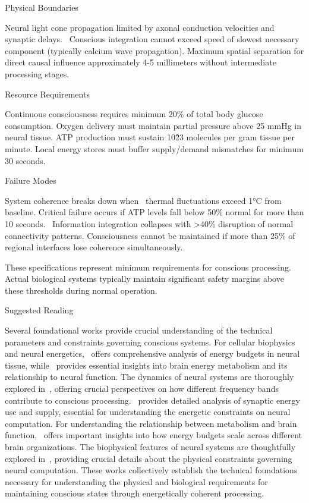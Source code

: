  Physical Boundaries

 Neural light cone propagation limited by axonal conduction velocities and synaptic delays.~ Conscious integration cannot exceed speed of slowest necessary component (typically calcium wave propagation). Maximum spatial separation for direct causal influence approximately 4-5 millimeters without intermediate processing stages.

 Resource Requirements

Continuous consciousness requires minimum 20\% of total body glucose consumption. Oxygen delivery must maintain partial pressure above 25 mmHg in neural tissue. ATP production must sustain 10\^23 molecules per gram tissue per minute. Local energy stores must buffer supply/demand mismatches for minimum 30 seconds.

 Failure Modes

System coherence breaks down when~ thermal fluctuations exceed 1°C from baseline. Critical failure occurs if ATP levels fall below 50\% normal for more than 10 seconds.~ Information integration collapses with >40\% disruption of normal connectivity patterns. Consciousness cannot be maintained if more than 25\% of regional interfaces lose coherence simultaneously.

These specifications represent minimum requirements for conscious processing. Actual biological systems typically maintain significant safety margins above these thresholds during normal operation.

Suggested Reading

Several foundational works provide crucial understanding of the technical parameters and constraints governing conscious systems. For cellular biophysics and neural energetics,~\cite{attwell2001energy} offers comprehensive analysis of energy budgets in neural tissue, while~\cite{magistretti2015cellular} provides essential insights into brain energy metabolism and its relationship to neural function. The dynamics of neural systems are thoroughly explored in~\cite{buzsaki2006rhythms}, offering crucial perspectives on how different frequency bands contribute to conscious processing.~\cite{harris2012synaptic} provides detailed analysis of synaptic energy use and supply, essential for understanding the energetic constraints on neural computation. For understanding the relationship between metabolism and brain function,~\cite{herculano2011scaling} offers important insights into how energy budgets scale across different brain organizations. The biophysical features of neural systems are thoughtfully explored in~\cite{georgiou2012biophysical}, providing crucial details about the physical constraints governing neural computation. These works collectively establish the technical foundations necessary for understanding the physical and biological requirements for maintaining conscious states through energetically coherent processing.